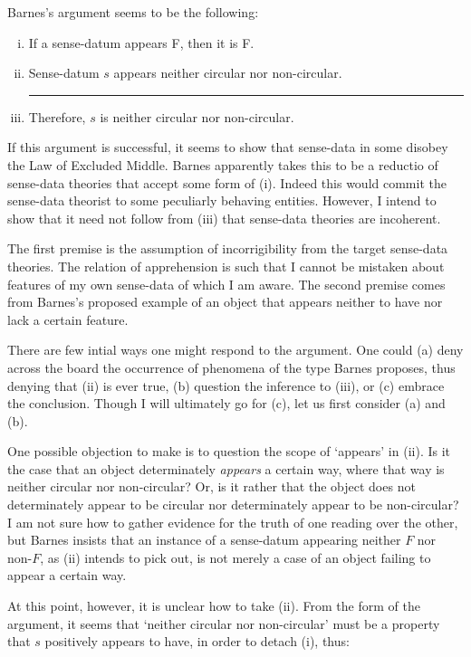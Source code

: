 \noindent Barnes's argument seems to be the following:

\begin{enumerate}[i.]
\item If a sense-datum appears F, then it is F.
\item Sense-datum $s$ appears neither circular nor non-circular.
\smallskip
\hrule width 325pt
\item Therefore, $s$ is neither circular nor non-circular.
\end{enumerate}

\noindent If this argument is successful, it seems to show that sense-data in some disobey the Law of Excluded Middle. Barnes apparently takes this to be a reductio of sense-data theories that accept some form of (i). Indeed this would commit the sense-data theorist to some peculiarly behaving entities. However, I intend to show that it need not follow from (iii) that sense-data theories are incoherent.

The first premise is the assumption of incorrigibility from the target sense-data theories. The relation of apprehension is such that I cannot be mistaken about features of my own sense-data of which I am aware. The second premise comes from Barnes's proposed example of an object that appears neither to have nor lack a certain feature.

There are few intial ways one might respond to the argument. One could (a) deny across the board the occurrence of phenomena of the type Barnes proposes, thus denying that (ii) is ever true, (b) question the inference to (iii), or (c) embrace the conclusion. Though I will ultimately go for (c), let us first consider (a) and (b).

One possible objection to make is to question the scope of `appears' in (ii). Is it the case that an object determinately \emph{appears} a certain way, where that way is neither circular nor non-circular? Or, is it rather that the object does not determinately appear to be circular nor determinately appear to be non-circular? I am not sure how to gather evidence for the truth of one reading over the other, but Barnes insists that an instance of a sense-datum appearing neither $F$ nor non-$F$, as (ii) intends to pick out, is not merely a case of an object failing to appear a certain way.

At this point, however, it is unclear how to take (ii). From the form of the argument, it seems that `neither circular nor non-circular' must be a property that $s$ positively appears to have, in order to detach (i), thus:

